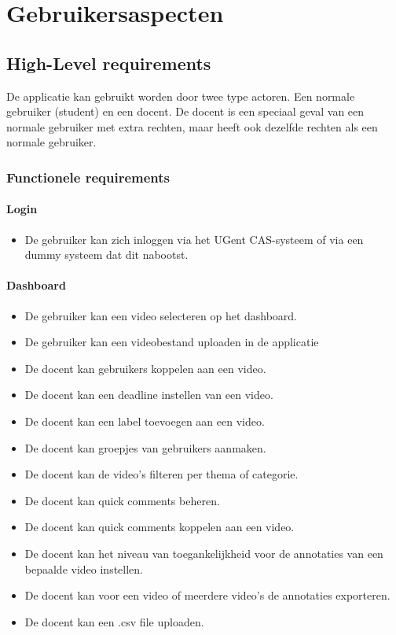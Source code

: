 \chapter{Gebruikersaspecten}
\label{ch:gebruikersaspecten}
\section{High-Level requirements}
De applicatie kan gebruikt worden door twee type actoren. Een normale gebruiker (student) en een docent. De docent is een speciaal geval van een normale gebruiker met extra rechten, maar heeft ook dezelfde rechten als een normale gebruiker.
\subsection{Functionele requirements}
\subsubsection{Login}
\begin{itemize}
	\item De gebruiker kan zich inloggen via het UGent CAS-systeem of via een dummy systeem dat dit nabootst.
\end{itemize}
\subsubsection{Dashboard}
\begin{itemize}
	\item De gebruiker kan een video selecteren op het dashboard.
    \item De gebruiker kan een videobestand uploaden in de applicatie
 	\item De docent kan gebruikers koppelen aan een video.
 	\item De docent kan een deadline instellen van een video.
 	\item De docent kan een label toevoegen aan een video.
 	\item De docent kan groepjes van gebruikers aanmaken.
 	\item De docent kan de video's filteren per thema of categorie.
 	\item De docent kan quick comments beheren.
 	\item De docent kan quick comments koppelen aan een video.
 	\item De docent kan het niveau van toegankelijkheid voor de annotaties van een bepaalde video instellen.
	\item De docent kan voor een video of meerdere video's de annotaties exporteren.
 	\item De docent kan een .csv file uploaden.

\end{itemize}
